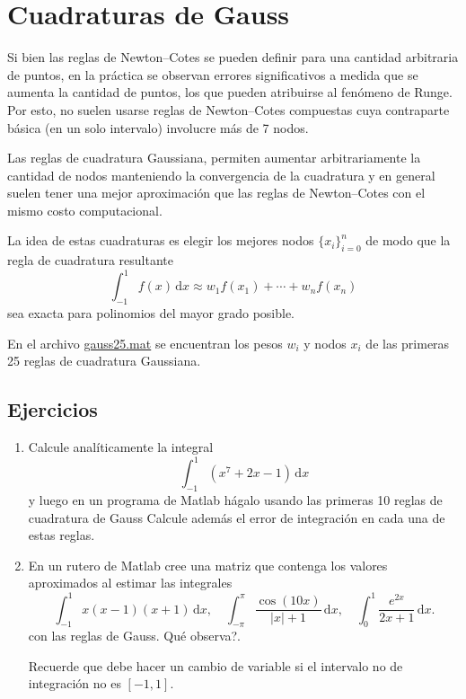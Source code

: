 \documentclass[letterpaper,11pt]{article}
\newcommand{\matlab}{{\sc Matlab} }
\begin{document}
\section{Cuadraturas de Gauss}

Si bien las reglas de Newton--Cotes se pueden definir para una cantidad arbitraria de puntos, en la pr\'actica se observan errores significativos a medida que se aumenta la cantidad de puntos, los que pueden atribuirse al fen\'omeno de Runge.
Por esto, no suelen usarse reglas de Newton--Cotes compuestas cuya contraparte b\'asica (en un solo intervalo) involucre m\'as de 7 nodos.

Las reglas de cuadratura Gaussiana, permiten aumentar arbitrariamente la cantidad de nodos manteniendo la convergencia de la cuadratura y en general suelen tener una mejor aproximaci\'on que las reglas de Newton--Cotes con el mismo costo computacional.

La idea de estas cuadraturas es elegir los mejores nodos $\{x_i\}_{i=0}^n$ de modo que la regla de cuadratura resultante
$$
\displaystyle
\int_{-1}^1 f(x)\,\mathrm{d}x \approx w_1 f(x_1) +\cdots+ w_n f(x_n)
$$
sea exacta para polinomios del mayor grado posible.

En el archivo 
 \href{ftp://ftp.ing-mat.udec.cl/pub/ing-mat/asignaturas/521230/ejercicios/2018-1/gauss25.mat}{gauss25.mat}
se encuentran los pesos $w_i$ y nodos $x_i$ de las primeras 25 reglas de cuadratura Gaussiana.

\subsection{Ejercicios}
\begin{enumerate}
	\item Calcule anal\'iticamente la integral
    $$
    \int_{-1}^1 (x^7+2x-1) \,\mathrm{d}x
    $$
    y luego en un programa de \matlab h\'agalo usando las primeras 10 reglas de cuadratura de Gauss Calcule adem\'as el error de integraci\'on en cada una de estas reglas.
    
	\item En un rutero de \matlab cree una matriz que contenga los valores aproximados al estimar las integrales
    $$
    \displaystyle
    \int_{-1}^1 x(x-1)(x+1)\, \mathrm{d}x,
    \quad
    \int_{-\pi}^\pi \frac{\cos(10x)}{|x|+1}\, \mathrm{d}x,
    \quad
    \int_{0}^1 \frac{e^{2x}}{2x+1}\, \mathrm{d}x.
    $$
con las reglas de Gauss. \textquestiondown Qu\'e observa?.

Recuerde que debe hacer un cambio de variable si el intervalo no de integraci\'on no es $[-1,1]$.
\end{enumerate}
\end{document}
